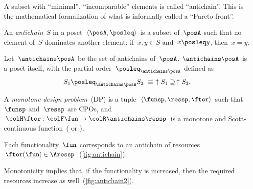 A subset with ``minimal'', ``incomparable'' elements is called
``antichain''. This is the mathematical formalization of what is
informally called a ``Pareto front''.


\begin{definition}
An \emph{antichain}~$S$ in a poset~$\left\langle \posA,\posleq\right\rangle $
is a subset of~$\posA$ such that no element of~$S$ dominates another
element: if~$x,y\in S$ and~$x\posleq y$, then~$x=y$.
\end{definition}
\begin{lemma}
Let~$\antichains\posA$ be the set of antichains of~$\posA$. $\antichains\posA$
is a poset itself, with the partial order~$\posleq_{\antichains\posA}$
defined as
\begin{equation}
S_{1}\posleq_{\antichains\posA}S_{2}\ \equiv\ \uparrow S_{1}\supseteq\,\uparrow S_{2}.\label{eq:orderantichains}
\end{equation}
\end{lemma}
\begin{definition}
\label{def:A-monotone-design}A\emph{ monotone design problem~}(DP)
is a tuple~$\left\langle \funsp,\ressp,\ftor\right\rangle $ such
that~$\funsp$ and~$\ressp$ are CPOs, and~${\colH\ftor}:{\colF\fun}\rightarrow{\colR\antichains\ressp}$
is a monotone and Scott-continuous function~(\cite{gierz03continuous}
or \cite[Definition 11]{censi16codesign_sep16}).
\end{definition}

\noindent Each functionality~$\fun$ corresponds to an antichain
of resources~$\ftor(\fun)\in\Aressp$~(\cref{fig:antichain}).


\noindent Monotonicity implies that, if the functionality is increased,
then the required resources increase as well~(\cref{fig:antichain2}).

